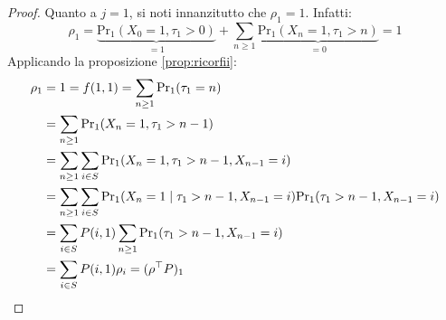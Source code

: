 \documentclass{article}
\theoremstyle{plain}
\newcommand{\tra}{^\top}
\renewcommand{\Pr}{\mathrm{Pr}}
\begin{document}
\begin{proof}
	Quanto a $j=1$, si noti innanzitutto che $\rho_1=1$. Infatti:
	\begin{equation*}
		\rho_1 = \underbrace{\Pr_1(X_0=1,\tau_1>0)}_{=1} + \sum_{n\ge1} \underbrace{\Pr_1(X_n=1,\tau_1>n)}_{=0} = 1
	\end{equation*}
	Applicando la proposizione \ref{prop:ricorfii}:
	\begin{align*}
		\rho_1 & = 1 = f(1,1) = \sum_{n\ge1} \Pr_1(\tau_1=n)                                                  \\
		       & = \sum_{n\ge1} \Pr_1(X_n=1,\tau_1>n-1)                                                       \\
		       & = \sum_{n\ge1} \sum_{i\in S} \Pr_1(X_n=1,\tau_1>n-1,X_{n-1}=i)                               \\
		       & = \sum_{n\ge1} \sum_{i\in S} \Pr_1(X_n=1\mid\tau_1>n-1,X_{n-1}=i)\Pr_1(\tau_1>n-1,X_{n-1}=i) \\
		       & = \sum_{i\in S} P(i,1) \sum_{n\ge1} \Pr_1(\tau_1>n-1,X_{n-1}=i)                              \\
		       & = \sum_{i\in S} P(i,1) \rho_i = (\rho\tra P)_1 \qedhere
	\end{align*}
\end{proof}
\end{document}

